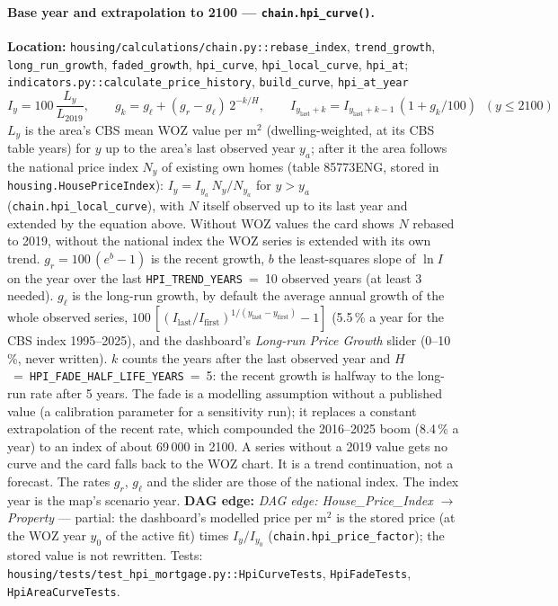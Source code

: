 \documentclass[11pt]{article}
\newcommand{\code}[1]{\texttt{#1}}
\newcommand{\dagedge}[1]{\textit{DAG edge: #1}}
\newcommand{\statuspartial}{\textcolor{orange!80!black}{partial}}
\begin{document}
\paragraph{Base year and extrapolation to 2100 --- \code{chain.hpi\_curve()}.}
\textbf{Location:} \code{housing/calculations/chain.py::rebase\_index}, \code{trend\_growth}, \code{long\_run\_growth}, \code{faded\_growth}, \code{hpi\_curve}, \code{hpi\_local\_curve}, \code{hpi\_at}; \code{indicators.py::calculate\_price\_history}, \code{build\_curve}, \code{hpi\_at\_year}
\begin{equation}
  I_y = 100\,\frac{L_y}{L_{2019}}, \qquad
  g_k = g_\ell + (g_r - g_\ell)\,2^{-k/H}, \qquad
  I_{y_\text{last}+k} = I_{y_\text{last}+k-1}\,(1 + g_k/100)\;\; (y \le 2100)
\end{equation}
$L_y$ is the area's CBS mean WOZ value per m$^2$ (dwelling-weighted, at its CBS table years) for $y$ up to the area's last observed year $y_a$; after it the area follows the national price index $N_y$ of existing own homes (table 85773ENG, stored in \code{housing.HousePriceIndex}): $I_y = I_{y_a}\,N_y/N_{y_a}$ for $y > y_a$ (\code{chain.hpi\_local\_curve}), with $N$ itself observed up to its last year and extended by the equation above. Without WOZ values the card shows $N$ rebased to 2019, without the national index the WOZ series is extended with its own trend. $g_r = 100\,(e^{b}-1)$ is the recent growth, $b$ the least-squares slope of $\ln I$ on the year over the last \code{HPI\_TREND\_YEARS}~=~10 observed years (at least 3 needed). $g_\ell$ is the long-run growth, by default the average annual growth of the whole observed series, $100\,[(I_\text{last}/I_\text{first})^{1/(y_\text{last}-y_\text{first})}-1]$ (5.5\,\% a year for the CBS index 1995--2025), and the dashboard's \emph{Long-run Price Growth} slider (0--10\,\%, never written). $k$ counts the years after the last observed year and $H$~=~\code{HPI\_FADE\_HALF\_LIFE\_YEARS}~=~5: the recent growth is halfway to the long-run rate after 5 years. The fade is a modelling assumption without a published value (a calibration parameter for a sensitivity run); it replaces a constant extrapolation of the recent rate, which compounded the 2016--2025 boom (8.4\,\% a year) to an index of about 69\,000 in 2100. A series without a 2019 value gets no curve and the card falls back to the WOZ chart. It is a trend continuation, not a forecast. The rates $g_r$, $g_\ell$ and the slider are those of the national index. The index year is the map's scenario year. \textbf{DAG edge:} \dagedge{House\_Price\_Index $\rightarrow$ Property} --- \statuspartial{}: the dashboard's modelled price per m$^2$ is the stored price (at the WOZ year $y_0$ of the active fit) times $I_y / I_{y_0}$ (\code{chain.hpi\_price\_factor}); the stored value is not rewritten. Tests: \code{housing/tests/test\_hpi\_mortgage.py::HpiCurveTests}, \code{HpiFadeTests}, \code{HpiAreaCurveTests}.
\end{document}
